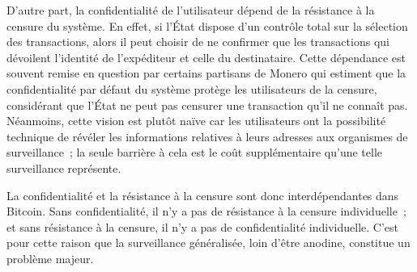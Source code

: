 D'autre part, la confidentialité de l'utilisateur dépend de la résistance à la censure du système. En effet, si l'État dispose d'un contrôle total sur la sélection des transactions, alors il peut choisir de ne confirmer que les transactions qui dévoilent l'identité de l'expéditeur et celle du destinataire. Cette dépendance est souvent remise en question par certains partisans de Monero qui estiment que la confidentialité par défaut du système protège les utilisateurs de la censure, considérant que l'État ne peut pas censurer une transaction qu'il ne connaît pas. Néanmoins, cette vision est plutôt naïve car les utilisateurs ont la possibilité technique de révéler les informations relatives à leurs adresses aux organismes de surveillance~; la seule barrière à cela est le coût supplémentaire qu'une telle surveillance représente. %

La confidentialité et la résistance à la censure sont donc interdépendantes dans Bitcoin. Sans confidentialité, il n'y a pas de résistance à la censure individuelle~; et sans résistance à la censure, il n'y a pas de confidentialité individuelle. C'est pour cette raison que la surveillance généralisée, loin d'être anodine, constitue un problème majeur.


